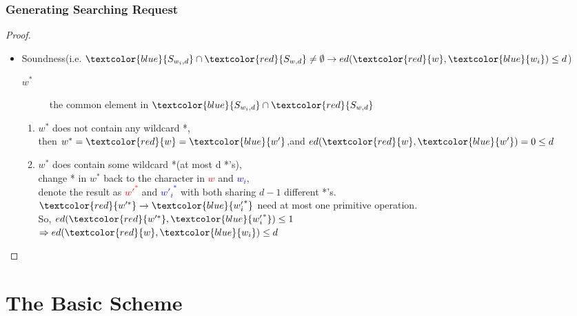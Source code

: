 \documentclass{beamer}
\begin{document}
\begin{frame}
	\frametitle{Generating Searching Request}
	\begin{proof}
		\begin{itemize}
			\item Soundness(i.e. $\textcolor{blue}{S_{{w_i},d}} \cap \textcolor{red}{S_{w,d}} \ne \emptyset  \to ed(\textcolor{red}{w},\textcolor{blue}{w_i}) \le d$) \\
			\begin{description}
				\item[${w^*}$]the common element in $\textcolor{blue}{S_{{w_i},d}} \cap \textcolor{red}{S_{w,d}}$
			\end{description}
			\begin{enumerate}
				\item ${w^*}$ does not contain any wildcard *,\\
				then ${w^*} =\textcolor{red}{ w} =\textcolor{blue}{ w'}$,and $ed(\textcolor{red}{w},\textcolor{blue}{w'}) = 0 \le d$
				\item ${w^*}$ does contain some wildcard *(at most d *'s),\\
				change * in $w^*$ back to the character in \textcolor{red}{$w$} and \textcolor{blue}{$w_i$},\\
				denote the result as \textcolor{red}{$w{'^*}$} and \textcolor{blue}{$w{'_i}^*$} with both sharing $d-1$ different *'s.\\
				$\textcolor{red}{w{'^*}} \to \textcolor{blue}{w{'_i}^*}$ need at most one primitive operation.\\
				So, $ed(\textcolor{red}{w{'^*}},\textcolor{blue}{w{'_i}^*}) \le 1$\\
				$ \Rightarrow ed(\textcolor{red}{w},\textcolor{blue}{{w_i}}) \le d$
				
			\end{enumerate}
		\end{itemize}
	\end{proof}
\end{frame}

\section{The Basic Scheme}
\end{document}
